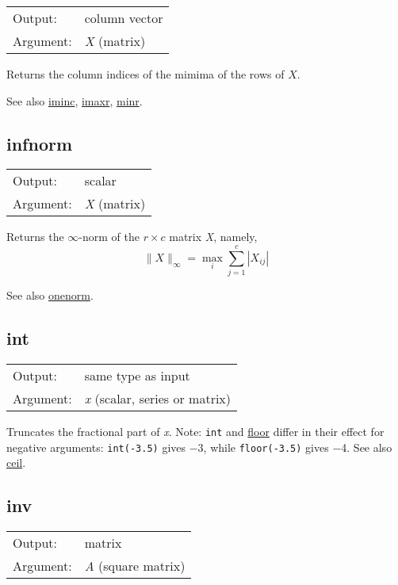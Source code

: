 \begin{tabular}{ll}
Output:     & column vector\\
Argument:   & \textsl{X} (matrix)\\
\end{tabular}

	  Returns the column indices of the mimima of the rows of
	  \ensuremath{X}. 

	  See also \hyperlink{func-iminc}{iminc}, \hyperlink{func-imaxr}{imaxr}, \hyperlink{func-minr}{minr}.

\subsection{infnorm}
\hypertarget{func-infnorm}{}

\begin{tabular}{ll}
Output:     & scalar\\
Argument:   & \textsl{X} (matrix)\\
\end{tabular}

	  Returns the $\infty$-norm of the $r\times c$ matrix
	  \textsl{X}, namely, 
	    \[\| X \|_{\infty} = \max_i \sum_{j=1}^c |X_{ij}|\]

	  See also \hyperlink{func-onenorm}{onenorm}.

\subsection{int}
\hypertarget{func-int}{}

\begin{tabular}{ll}
Output:     & same type as input\\
Argument:   & \textsl{x} (scalar, series or matrix)\\
\end{tabular}

	  Truncates the fractional part of \textsl{x}. Note:
	  \texttt{int} and \hyperlink{func-floor}{floor} differ in their effect
	  for negative arguments: \texttt{int(-3.5)} gives $-$3,
	  while \texttt{floor(-3.5)} gives $-$4. 
	  See also \hyperlink{func-ceil}{ceil}.

\subsection{inv}
\hypertarget{func-inv}{}

\begin{tabular}{ll}
Output:     & matrix\\
Argument:   & \textsl{A} (square matrix)\\
\end{tabular}

